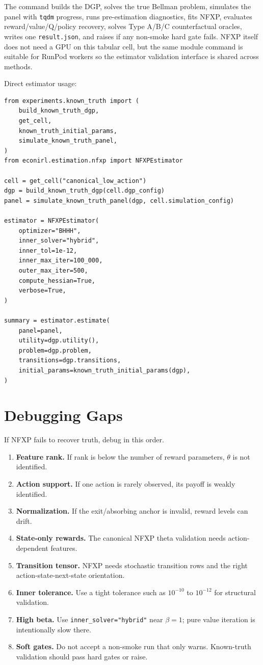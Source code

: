 \documentclass[10pt]{article}
\begin{document}
The command builds the DGP, solves the true Bellman problem, simulates the
panel with \texttt{tqdm} progress, runs pre-estimation diagnostics, fits NFXP,
evaluates reward/value/Q/policy recovery, solves Type A/B/C counterfactual
oracles, writes one \texttt{result.json}, and raises if any non-smoke hard gate
fails. NFXP itself does not need a GPU on this tabular cell, but the same module
command is suitable for RunPod workers so the estimator validation interface is
shared across methods.

Direct estimator usage:

\begin{lstlisting}
from experiments.known_truth import (
    build_known_truth_dgp,
    get_cell,
    known_truth_initial_params,
    simulate_known_truth_panel,
)
from econirl.estimation.nfxp import NFXPEstimator

cell = get_cell("canonical_low_action")
dgp = build_known_truth_dgp(cell.dgp_config)
panel = simulate_known_truth_panel(dgp, cell.simulation_config)

estimator = NFXPEstimator(
    optimizer="BHHH",
    inner_solver="hybrid",
    inner_tol=1e-12,
    inner_max_iter=100_000,
    outer_max_iter=500,
    compute_hessian=True,
    verbose=True,
)

summary = estimator.estimate(
    panel=panel,
    utility=dgp.utility(),
    problem=dgp.problem,
    transitions=dgp.transitions,
    initial_params=known_truth_initial_params(dgp),
)
\end{lstlisting}



\section{Debugging Gaps}

If NFXP fails to recover truth, debug in this order.

\begin{enumerate}
\item \textbf{Feature rank.} If rank is below the number of reward parameters,
$\theta$ is not identified.
\item \textbf{Action support.} If one action is rarely observed, its payoff is
weakly identified.
\item \textbf{Normalization.} If the exit/absorbing anchor is invalid, reward
levels can drift.
\item \textbf{State-only rewards.} The canonical NFXP theta validation needs
action-dependent features.
\item \textbf{Transition tensor.} NFXP needs stochastic transition rows and the
right action-state-next-state orientation.
\item \textbf{Inner tolerance.} Use a tight tolerance such as $10^{-10}$ to
$10^{-12}$ for structural validation.
\item \textbf{High beta.} Use \texttt{inner\_solver="hybrid"} near $\beta=1$;
pure value iteration is intentionally slow there.
\item \textbf{Soft gates.} Do not accept a non-smoke run that only warns.
Known-truth validation should pass hard gates or raise.
\end{enumerate}
\end{document}

